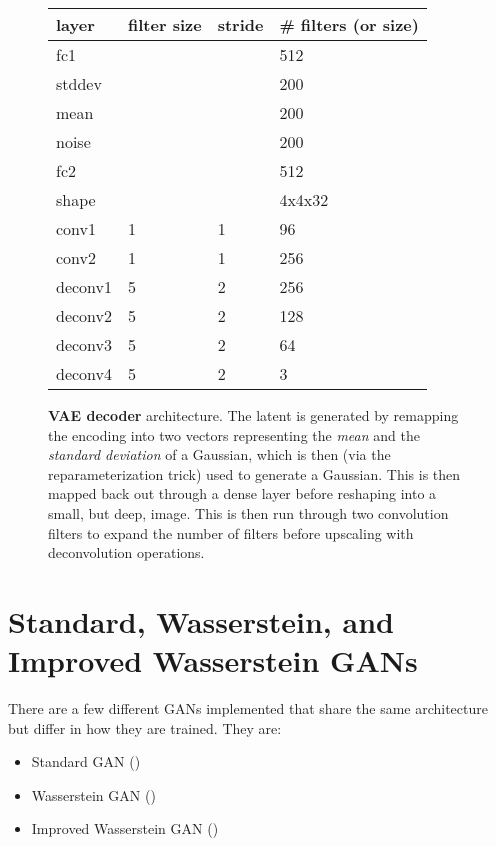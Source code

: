 \documentclass[twoside,11pt,a4paper]{article}
\begin{document}
\begin{figure}
\begin{center}
    \begin{tabular}{l||l|l|l}
      layer & filter size & stride & \# filters (or size) \\
      \hline
      fc1 & & & 512 \\
      stddev & & & 200 \\
      mean & & & 200 \\
      noise & & & 200 \\
      fc2 & & & 512 \\
      shape & & & 4x4x32\\
      \hline
      conv1 & 1 & 1 & 96 \\
      conv2 & 1 & 1 & 256 \\
      \hline
      deconv1 & 5 & 2 & 256 \\
      deconv2 & 5 & 2 & 128 \\
      deconv3 & 5 & 2 & 64 \\            
      deconv4 & 5 & 2 & 3 \\     
      
    \end{tabular}

    
  \end{center}
  \caption{\textbf{VAE decoder} architecture. The latent is generated by remapping the encoding into two vectors representing the \emph{mean} and the \emph{standard deviation} of a Gaussian, which is then (via the reparameterization trick) used to generate a Gaussian. This is then mapped back out through a dense layer before reshaping into a small, but deep, image. This is then run through two convolution filters to expand the number of filters before upscaling with deconvolution operations.}
  \label{fig:vae-decoder}  
\end{figure}


\section{Standard, Wasserstein, and Improved Wasserstein GANs}

There are a few different GANs implemented that share the same architecture but differ in how they are trained. They are:

\begin{itemize}
\item Standard GAN (\cite{goodfellow2014generative})
\item Wasserstein GAN (\cite{arjovsky2017wasserstein})
\item Improved Wasserstein GAN (\cite{gulrajani2017improved})
\end{itemize}
\end{document}
